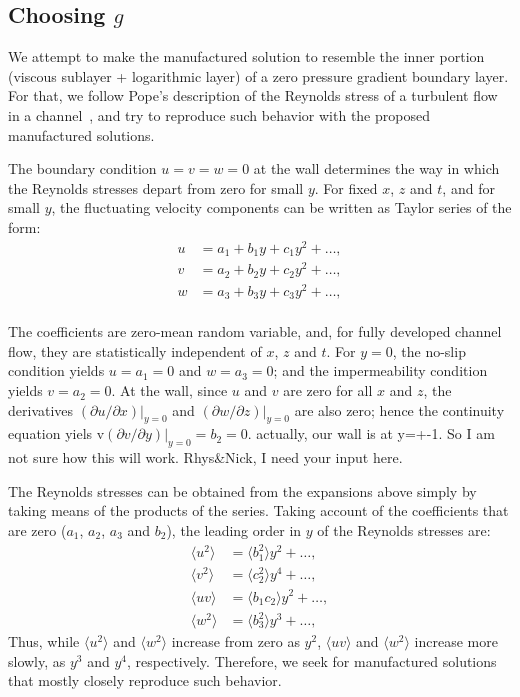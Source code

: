 \documentclass[10pt]{article}
\newcommand{\todo}[1]{ {\color{blue} #1} }
\begin{document}
\subsection{Choosing $g$}
We attempt to make the manufactured solution to resemble the inner portion (viscous sublayer + logarithmic
layer) of a zero pressure gradient boundary layer. For that, we follow Pope's description of the Reynolds stress of a turbulent flow in a channel~\cite{pope2000turbulent}, and try to reproduce such behavior with the proposed manufactured solutions.

The boundary condition $u=v=w=0$ at the wall determines the way in which the Reynolds stresses depart from zero for small $y$. For fixed $x$, $z$ and $t$, and for small $y$, the fluctuating velocity components can be written as Taylor series of the form:
\begin{equation}
\begin{split}
u &= a_1 + b_1 y + c_1 y^2 + \dots, \\
v &= a_2 + b_2 y + c_2 y^2 + \dots, \\
w &= a_3 + b_3 y + c_3 y^2 + \dots, \\ 
\end{split}
\end{equation}

The coefficients are zero-mean random variable, and, for fully developed channel flow, they are statistically independent of $x$, $z$ and $t$. For $y=0$, the no-slip condition yields $u=a_1=0$ and $w=a_3=0$; and the impermeability condition yields $v=a_2=0$. At the wall, since $u$ and $v$ are zero for all $x$ and $z$,  the derivatives $(\partial u/ \partial x)|_{y=0}$ and $(\partial w/ \partial z)|_{y=0}$ are also zero; hence the continuity equation yiels v$(\partial v/ \partial y)|_{y=0}=b_2=0$.
\todo{actually, our wall is at y=+-1. So I am not sure how this will work. Rhys\&Nick, I need your input here.}

The Reynolds stresses can be obtained from the expansions above simply by taking means of the products of the series. Taking account of the coefficients that are zero ($a_1$, $a_2$, $a_3$ and $b_2$), the leading order in $y$ of the Reynolds stresses are:
\begin{equation}
\begin{split}
\langle u^2 \rangle &= \langle b_1^2 \rangle y^2  + \dots, \\
\langle v^2 \rangle &= \langle c_2^2 \rangle y^4 + \dots, \\
\langle uv  \rangle &= \langle b_1 c_2 \rangle y^2 + \dots, \\
\langle w^2 \rangle &= \langle b_3^2 \rangle y^3 + \dots, 
\end{split}
\end{equation}
Thus, while $\langle u^2 \rangle$ and $\langle w^2 \rangle$ increase from zero as $y^2$, $\langle uv  \rangle$ and 
$\langle w^2 \rangle$ increase more slowly, as $y^3$ and $y^4$, respectively. Therefore, we seek for manufactured solutions that mostly closely reproduce such behavior.
\end{document}

